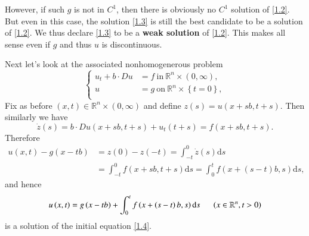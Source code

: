 However, if such $g$ is not in $C^1$, then there is obviously no $C^1$ solution of \eqref{1.2}. But even in this case, the solution \eqref{1.3} is still the best candidate to be a solution of \eqref{1.2}. We thus declare \eqref{1.3} to be a \textbf{weak solution} of \eqref{1.2}. This makes all sense even if $g$ and thus $u$ is discontinuous.\par
Next let's look at the associated nonhomogenerous problem 
\begin{equation}\label{1.4}
\left\{ \begin{aligned}
	u_t+b\cdot Du&=f\ \text{in}\ \mathbb{R} ^n\times \left( 0,\infty \right) ,\\
	u&=g\ \text{on}\ \mathbb{R} ^n\times \left\{ t=0 \right\} ,\\
\end{aligned} \right. 
\end{equation}
Fix as before $(x,t)\in\mathbb{R}^n\times(0,\infty)$ and define $z(s)=u(x+sb,t+s)$. Then similarly we have 
$$
\dot{z}\left( s \right) =b\cdot Du\left( x+sb,t+s \right) +u_t\left( t+s \right) =f\left( x+sb,t+s \right) .
$$
Therefore 
$$
\begin{aligned}
u\left( x,t \right) -g\left( x-tb \right) &=z\left( 0 \right) -z\left( -t \right) =\int_{-t}^0{\dot{z}\left( s \right) \mathrm{d}s}
\\
&=\int_{-t}^0{f\left( x+sb,t+s \right) \mathrm{d}s}=\int_0^t{f\left( x+\left( s-t \right) b,s \right) \mathrm{d}s},
\end{aligned}
$$
and hence 
\begin{equation}\label{1.98}
u\left( x,t \right) =g\left( x-tb \right) +\int_0^t{f\left( x+\left( s-t \right) b,s \right) \mathrm{d}s}\hspace{0.5cm}\left( x\in \mathbb{R} ^n,t>0 \right) 
\end{equation}
is a solution of the initial equation \eqref{1.4}.

